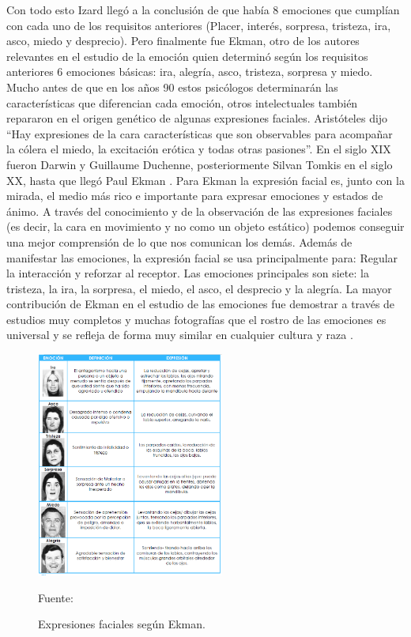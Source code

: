 Con todo esto Izard llegó a la conclusión de que había 8 emociones que cumplían con cada uno de los requisitos anteriores (Placer, interés, sorpresa, tristeza, ira, asco, miedo y desprecio). Pero finalmente fue Ekman, otro de los autores relevantes en el estudio de la emoción quien determinó según los requisitos anteriores 6 emociones básicas: ira, alegría, asco, tristeza, sorpresa y miedo.
\vskip 0.1cm
Mucho antes de que en los años 90 estos psicólogos determinarán las características que diferencian cada emoción, otros intelectuales también repararon en el origen genético de algunas expresiones faciales.
\vskip 0.1cm
Aristóteles dijo “Hay expresiones de la cara características que son observables para acompañar la cólera el miedo, la excitación erótica y todas otras pasiones”.
En el siglo XIX fueron Darwin y Guillaume Duchenne, posteriormente Silvan Tomkis en el siglo XX, hasta que llegó Paul Ekman \citep{Bartual}.
\vskip 0.1cm
Para Ekman la expresión facial es, junto con la mirada, el medio más rico e importante para expresar emociones y estados de ánimo. A través del conocimiento y de la observación de las expresiones faciales (es decir, la cara en movimiento y no como un objeto estático) podemos conseguir una mejor comprensión de lo que nos comunican los demás. Además de manifestar las emociones, la expresión facial se usa principalmente para:  Regular la interacción y reforzar al receptor.
\vskip 0.1cm
Las emociones principales son siete: la tristeza, la ira, la sorpresa, el miedo, el asco, el desprecio y la alegría. La mayor contribución de Ekman en el estudio de las emociones fue demostrar a través de estudios muy completos y muchas fotografías que el rostro de las emociones es universal y se refleja de forma muy similar en cualquier cultura y raza \citep{Ekman}.

\begin{figure}[ht]
\begin{center}
\includegraphics[width=0.55\textwidth]{Imagen8}
\end{center}
\begin{center}
\vskip -0.5cm
\caption{\small{Expresiones faciales según Ekman.}}
{\small{Fuente: \cite{Ekman}}}
\end{center}
\end{figure}

